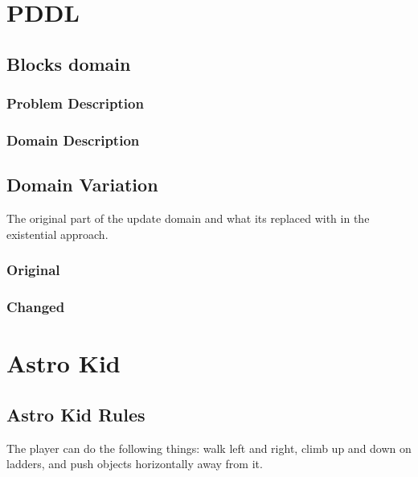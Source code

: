 
\lstset{tabsize=2}
\chapter{PDDL}

\section{Blocks domain}\label{blocks}
\subsection{Problem Description}\label{blocks-prob}

\subsection{Domain Description}\label{blocks-domain}



\section{Domain Variation}\label{Domain_Variation}
The original part of the update domain and what its replaced with in the existential approach.
\subsection{Original}\label{domain}

\subsection{Changed}\label{domain2}



\chapter{Astro Kid}
\section{Astro Kid Rules}

The player can do the following things: walk left and right, climb up and down on ladders, and push objects horizontally away from it.
